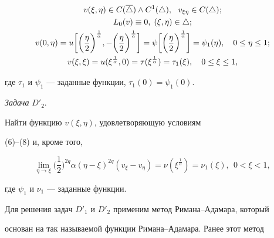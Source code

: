 \begin{gather}


v(\xi,\eta)\in C(\overline\triangle)\land C^1(\triangle), 


\ \ v_{\xi\eta}\in C(\triangle);\\


%


L_0(v)\equiv 0, \;(\xi,\eta)\in \triangle; \\


%


v(0,\eta)=u\bigg


[\bigg(\frac{\eta}{2}\bigg)^{\frac{1}{\alpha}},


-\bigg(\frac{\eta}{2}\bigg)^{\frac{1}{\alpha}}  \bigg]=\psi 


\bigg[\bigg(\frac{\eta}{2}\bigg)^{\frac{1}{\alpha}}\bigg]


=\psi_1(\eta), \quad 0\le \eta\le 1;\\


%


v(\xi,\xi)=u(\xi^{\frac{1}{\alpha}},0)=


\tau (\xi^{\frac{1}{\alpha}})=


\tau_1(\xi), \quad 0\le\xi\le 1, \notag


\end{gather}


где $\tau_1 $ и $\psi_1$ --- заданные функции, $\tau_1(0)=\psi_1(0)$.


\medskip





{\it Задача} $D'_2$.


Найти функцию $v(\xi,\eta)$, удовлетворяющую условиям


(6)--(8) и, кроме того,


$$


\lim_{\eta  \to \xi} \bigg(\frac{1}{2}\bigg)^{2q}\alpha


(\eta -\xi)^{2q}(v_\xi-v_\eta) = 


\nu(\xi^{\frac{1}{\alpha}})=\nu_1(\xi),\ \ 0<\xi<1,


$$


где $\psi_1 $ и $\nu_1$ --- заданные функции.


\medskip


  


Для решения задач $D'_1$ и $D'_2$ применим метод Римана--Адамара, который 


основан на так называемой функции Римана--Адамара. Ранее этот метод 


